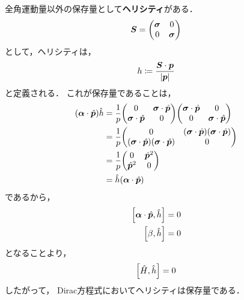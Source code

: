 \documentclass{report}
\begin{document}
  全角運動量以外の保存量として\textbf{ヘリシティ}がある．
  \begin{align}
    \bm{\bm{S}} = 
    \mqty(
      \bm{\sigma} & 0\\
      0 & \bm{\sigma}
    )
  \end{align}
  として，ヘリシティは，
  \begin{align}
    h \coloneqq \frac{\bm{\bm{S}} \cdot \bm{p}}{\abs{\bm{p}}}
  \end{align}
  と定義される．
  これが保存量であることは，
  \begin{align}
    \qty(\bm{\alpha} \cdot \hat{\bm{p}}) \hat{h} 
    &= \frac{1}{p}\mqty(
      0 & \bm{\sigma} \cdot \hat{\bm{p}}\\
      \bm{\sigma} \cdot \hat{\bm{p}} & 0
    )\mqty(
      \bm{\sigma} \cdot \hat{\bm{p}} & 0\\
      0 & \bm{\sigma} \cdot \hat{\bm{p}}
    ) \\
    &= \frac{1}{p}\mqty(
      0 & (\bm{\sigma} \cdot \hat{\bm{p}})(\bm{\sigma} \cdot \hat{\bm{p}})\\
      (\bm{\sigma} \cdot \hat{\bm{p}})(\bm{\sigma} \cdot \hat{\bm{p}}) & 0
    ) \\
    &= \frac{1}{p}\mqty(
      0 & \hat{\bm{p}}^2\\
      \hat{\bm{p}}^2 & 0
    ) \\
    &= \hat{h}(\bm{\alpha}\cdot \hat{\bm{p}})
  \end{align}
  であるから，
  \begin{align}
    \qty[\bm{\alpha} \cdot \hat{\bm{p}}, \hat{h}] = 0\\
    \qty[\beta, \hat{h}] = 0
  \end{align}
  となることより，
  \begin{align}
    \qty[\hat{H}, \hat{h}] = 0
  \end{align}
  したがって，
  Dirac方程式においてヘリシティは保存量である．
\end{document}
